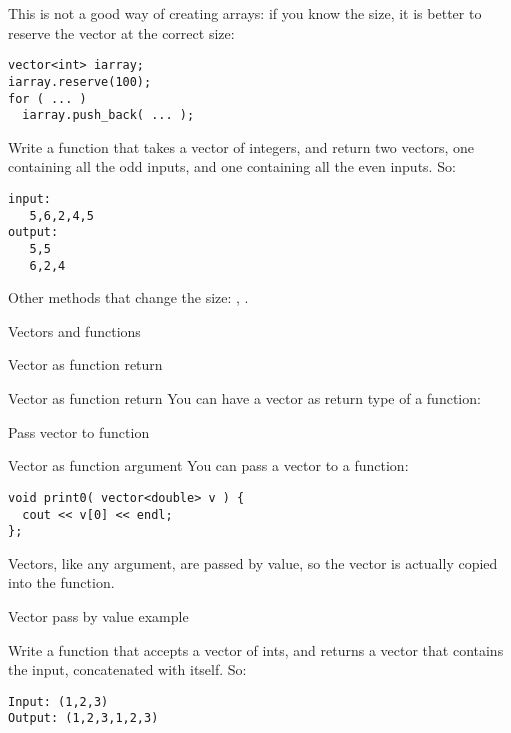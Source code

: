 This is not a good way of creating arrays: if you know the size, it is
better to reserve the vector at the correct size:
\begin{verbatim}
vector<int> iarray;
iarray.reserve(100);
for ( ... )
  iarray.push_back( ... );
\end{verbatim}

\begin{exercise}
  \label{ex:splitoddeven}
  Write a function that takes a vector of integers, and return two
  vectors, one containing all the odd inputs, and one containing all
  the even inputs. So:
\begin{verbatim}
input:
   5,6,2,4,5
output:
   5,5
   6,2,4
\end{verbatim}
\end{exercise}

Other methods that change the size: , .

 {Vectors and functions}

 {Vector as function return}

\begin{block}{Vector as function return}
  \label{sl:vector-return}
  You can have a vector as return type of a function:
\end{block}

 {Pass vector to function}

\begin{block}{Vector as function argument}
  \label{sl:vector-arg}
  You can pass a vector to a function:
\begin{verbatim}
void print0( vector<double> v ) {
  cout << v[0] << endl;
};
\end{verbatim}
Vectors, like any argument, are passed by value, so the vector is
actually copied into the function.
\end{block}

\begin{block}{Vector pass by value example}
  \label{sl:vector-arg-ex}
\end{block}

\begin{exercise}
  \label{ex:vectorconcat}
  Write a function that accepts a vector of ints, and returns a vector
  that contains the input, concatenated with itself. So:
\begin{verbatim}
Input: (1,2,3)
Output: (1,2,3,1,2,3)
\end{verbatim}
\end{exercise}

